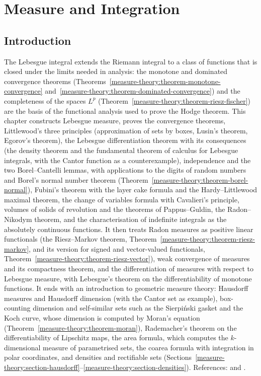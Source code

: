 \chapter{Measure and Integration}\label{measure-theory}

\section{Introduction}\label{measure-theory:section-introduction}

The Lebesgue integral extends the Riemann integral to a class of functions that is closed under the limits needed in analysis: the
monotone and dominated convergence theorems (Theorems~\ref{measure-theory:theorem-monotone-convergence}
and~\ref{measure-theory:theorem-dominated-convergence}) and the completeness of the spaces $L^p$
(Theorem~\ref{measure-theory:theorem-riesz-fischer}) are the basis of the functional analysis used to prove the Hodge theorem. This
chapter constructs Lebesgue measure, proves the convergence theorems, Littlewood's three principles (approximation of sets by boxes, Lusin's
theorem, Egorov's theorem), the Lebesgue differentiation theorem with its consequences (the density theorem and the fundamental theorem of calculus for
Lebesgue integrals, with the Cantor function as a counterexample), independence and the two Borel--Cantelli lemmas, with
applications to the digits of random numbers and Borel's normal number theorem (Theorem~\ref{measure-theory:theorem-borel-normal}), Fubini's theorem with the layer cake formula and the Hardy--Littlewood maximal theorem, the
change of variables formula with Cavalieri's principle, volumes of solids of revolution and the theorems of Pappus--Guldin, the Radon--Nikodym theorem, and the characterisation of indefinite integrals as the absolutely continuous functions. It then treats Radon measures as positive linear functionals
(the Riesz--Markov theorem, Theorem~\ref{measure-theory:theorem-riesz-markov}, and its version for signed and vector-valued functionals, Theorem~\ref{measure-theory:theorem-riesz-vector}), weak convergence of measures and its compactness theorem, and the differentiation of measures with respect to
Lebesgue measure, with Lebesgue's theorem on the differentiability of monotone functions. It ends with an introduction to
geometric measure theory: Hausdorff measures and Hausdorff dimension (with the Cantor set as example), box-counting dimension and self-similar sets such as the Sierpi\'nski gasket and the
Koch curve, whose dimension is computed by Moran's equation (Theorem~\ref{measure-theory:theorem-moran}), Rademacher's theorem on the differentiability of Lipschitz maps, the area formula,
which computes the $k$-dimensional measure of parametrised sets, the coarea formula with integration in polar coordinates, and densities and rectifiable sets
(Sections~\ref{measure-theory:section-hausdorff}--\ref{measure-theory:section-densities}).
References: \cite{rudin-rca} and \cite{folland-real}.

